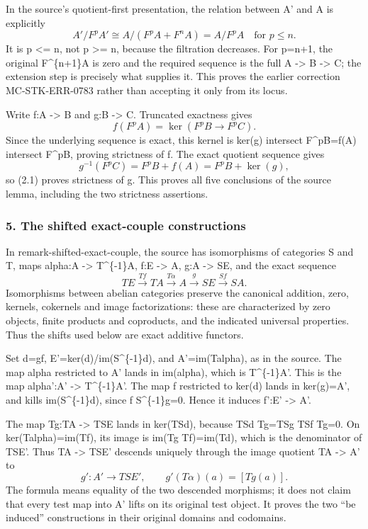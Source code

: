 \documentclass[11pt]{article}
\begin{document}
In the source's quotient-first presentation, the relation between A' and A is explicitly \[
A'/F^pA'
 \cong A/(F^pA+F^nA)=A/F^pA\quad\text{for }p\le n.        \tag{4.1}
\] It is p \textless= n, not p \textgreater= n, because the filtration decreases. For p=n+1, the original F\^{}\{n+1\}A is zero and the required sequence is the full A -\textgreater{} B -\textgreater{} C; the extension step is precisely what supplies it. This proves the earlier correction MC-STK-ERR-0783 rather than accepting it only from its locus.

Write f:A -\textgreater{} B and g:B -\textgreater{} C. Truncated exactness gives \[
f(F^pA)=\ker(F^pB\longrightarrow F^pC).
\] Since the underlying sequence is exact, this kernel is ker(g) intersect F\^{}pB=f(A) intersect F\^{}pB, proving strictness of f. The exact quotient sequence gives \[
g^{-1}(F^pC)=F^pB+f(A)=F^pB+\ker(g),
\] so (2.1) proves strictness of g. This proves all five conclusions of the source lemma, including the two strictness assertions.

\subsubsection{5. The shifted exact-couple constructions}\label{the-shifted-exact-couple-constructions}

In remark-shifted-exact-couple, the source has isomorphisms of categories S and T, maps alpha:A -\textgreater{} T\^{}\{-1\}A, f:E -\textgreater{} A, g:A -\textgreater{} SE, and the exact sequence \[
TE\xrightarrow{Tf}TA\xrightarrow{T\alpha}A
\xrightarrow{g}SE\xrightarrow{Sf}SA.
\] Isomorphisms between abelian categories preserve the canonical addition, zero, kernels, cokernels and image factorizations: these are characterized by zero objects, finite products and coproducts, and the indicated universal properties. Thus the shifts used below are exact additive functors.

Set d=gf, E'=ker(d)/im(S\^{}\{-1\}d), and A'=im(Talpha), as in the source. The map alpha restricted to A' lands in im(alpha), which is T\^{}\{-1\}A'. This is the map alpha':A' -\textgreater{} T\^{}\{-1\}A'. The map f restricted to ker(d) lands in ker(g)=A', and kills im(S\^{}\{-1\}d), since f S\^{}\{-1\}g=0. Hence it induces f':E' -\textgreater{} A'.

The map Tg:TA -\textgreater{} TSE lands in ker(TSd), because TSd Tg=TSg TSf Tg=0. On ker(Talpha)=im(Tf), its image is im(Tg Tf)=im(Td), which is the denominator of TSE'. Thus TA -\textgreater{} TSE' descends uniquely through the image quotient TA -\textgreater{} A' to \[
g':A'\longrightarrow TSE',\qquad
g'(T\alpha)(a)=[Tg(a)].                                  \tag{5.1}
\] The formula means equality of the two descended morphisms; it does not claim that every test map into A' lifts on its original test object. It proves the two ``be induced'' constructions in their original domains and codomains.
\end{document}
